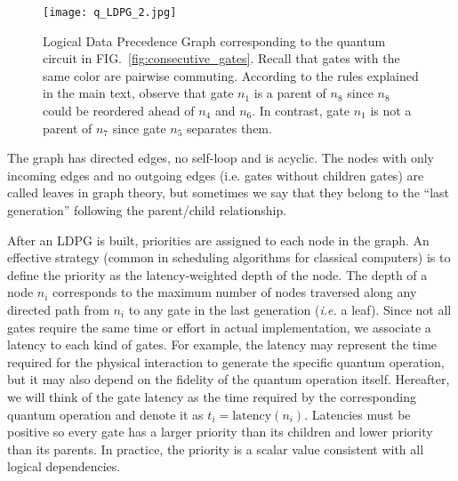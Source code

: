 \documentclass[%
onecolumn,pra,
superscriptaddress,
nofootinbib,
 amsmath,amssymb,
 aps,
11pt,
]{revtex4-1}
\def\note#1{\textbf{\color{red}[#1]}}
\begin{document}
\begin{figure}[b!]
\centering
\texttt{[image: q\_LDPG\_2.jpg]}
\caption{Logical Data Precedence Graph corresponding to the quantum circuit in FIG.~\ref{fig:consecutive_gates}. Recall that gates with the same color are pairwise commuting. According to the rules explained in the main text, observe that gate $n_1$ is a parent of $n_8$ since $n_8$ could be reordered ahead of $n_4$ and $n_6$. In contrast, gate $n_1$ is not a parent of $n_7$ since gate $n_5$ separates them.}\label{fig:example_LDPG}
\end{figure}

The graph has directed edges, no self-loop and is acyclic. The nodes with only incoming edges and no outgoing edges (i.e. gates without children gates) are called leaves in graph theory, but sometimes we say that they belong to the ``last generation'' following the parent/child relationship.

After an LDPG is built, priorities are assigned to each node in the graph. An effective strategy (common in scheduling algorithms for classical computers)
is to define the priority as the latency-weighted depth of the node. The depth of a node $n_i$ corresponds to the maximum number of nodes traversed along any directed path from $n_i$ to any gate in the last generation (\emph{i.e.} a leaf). Since not all gates require the same time or effort in actual implementation, we associate a latency to each kind of gates. For example, the latency may represent the time required for the physical interaction to generate the specific quantum operation, but it may also depend on the fidelity of the quantum operation itself. Hereafter, we will think of the gate latency as the time required by the corresponding quantum operation and denote it as $t_i=\text{latency}(n_i)$. Latencies must be positive so every gate has a larger priority than its children and lower priority than its parents. In practice, the priority is a scalar value consistent with all logical dependencies.
\end{document}
